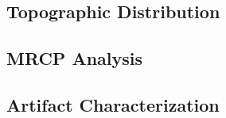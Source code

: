 \subsection{Topographic Distribution}
\label{subsec:results_topography}

%
%
%
%
%
%


\subsection{MRCP Analysis}
\label{subsec:results_mrcp}

%
%
%
%
%
%
%
%


\subsection{Artifact Characterization}
\label{subsec:results_artifacts}

%
%
%
%
%
%
%


